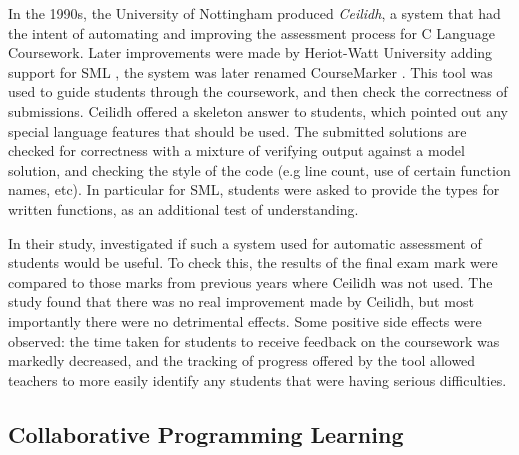 \documentclass[sigplan,10pt,review]{acmart}\settopmatter{printfolios=true}
\begin{document}

In the 1990s, the University of Nottingham produced \emph{Ceilidh}, a
system that had the intent of automating and improving the assessment
process for C Language Coursework. Later improvements were made by
Heriot-Watt University adding support for \ac{SML}
\cite{foubister_automatic_1997}, the system was later renamed
CourseMarker \cite{higgins_coursemarker_2003}. This tool was used to
guide students through the coursework, and then check the correctness
of submissions. Ceilidh offered a skeleton answer to students, which
pointed out any special language features that should be used. The
submitted solutions are checked for correctness with a mixture of
verifying output against a model solution, and checking the style of
the code (e.g line count, use of certain function names, etc).  In
particular for \ac{SML}, students were asked to provide the types for
written functions, as an additional test of understanding.

In their study, \citet{foubister_automatic_1997}
investigated if such a system used for automatic assessment of
students would be useful. To check this, the results of the final exam
mark were compared to those marks from previous years where Ceilidh
was not used. The study found that there was no real improvement made
by Ceilidh, but most importantly there were no detrimental
effects. Some positive side effects were observed: the time taken for
students to receive feedback on the coursework was markedly decreased,
and the tracking of progress offered by the tool allowed teachers to
more easily identify any students that were having serious
difficulties.

\subsection{Collaborative Programming Learning}
\end{document}
